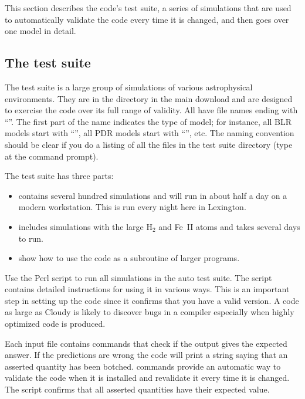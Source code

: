\documentclass[12pt,twoside]{article}
\begin{document}
{This section describes the code's test suite, a series of simulations
that are used to automatically validate the code every time it is changed,
and then goes over one model in detail.

\subsection{The test suite}

The test suite is a large group of simulations of various astrophysical
environments.  They are in the 
directory in the main download and
are designed to exercise the code over its full range of validity.  All
have file names ending with ``''.
The first part of the name indicates
the type of model; for instance, all BLR
models start with ``'', all
PDR models start with ``'', etc.
The naming convention should be clear
if you do a listing of all the files in the test suite directory (type
 at the command prompt).

The test suite has three parts:

\begin{itemize}
\item {} contains several hundred
simulations and will run in about half a day on a modern workstation.
This is run every night here in Lexington.

\item {} includes simulations with the
large H$_2$ and Fe~II atoms and takes several
days to run.

\item {} show how
to use the code as a subroutine of larger programs.
\end{itemize}

Use the Perl script 
to run all simulations in the auto test suite.
The script contains detailed instructions for using it in various ways.
This is an important step in setting up the code since it confirms
that you have a valid version.
A code as large as Cloudy is likely to
discover bugs in a compiler especially when highly optimized code is
produced.

Each input file contains 
commands that check if the output gives
the expected answer.  If the predictions are wrong the code will print a
string saying that an asserted quantity has
been botched.   commands
provide an automatic way to validate the code when it is installed and
revalidate it every time it is changed.
The script  confirms
that all asserted quantities have their expected value.

}
\end{document}
